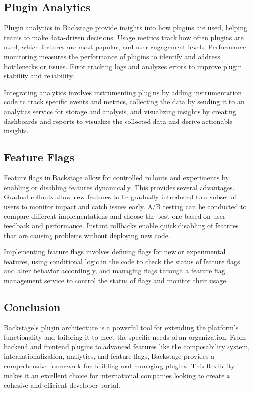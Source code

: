 \subsection{Plugin Analytics}

Plugin analytics in Backstage provide insights into how plugins are used, helping teams to make data-driven decisions. Usage metrics track how often plugins are used, which features are most popular, and user engagement levels. Performance monitoring measures the performance of plugins to identify and address bottlenecks or issues. Error tracking logs and analyzes errors to improve plugin stability and reliability.

Integrating analytics involves instrumenting plugins by adding instrumentation code to track specific events and metrics, collecting the data by sending it to an analytics service for storage and analysis, and visualizing insights by creating dashboards and reports to visualize the collected data and derive actionable insights.

\subsection{Feature Flags}

Feature flags in Backstage allow for controlled rollouts and experiments by enabling or disabling features dynamically. This provides several advantages. Gradual rollouts allow new features to be gradually introduced to a subset of users to monitor impact and catch issues early. A/B testing can be conducted to compare different implementations and choose the best one based on user feedback and performance. Instant rollbacks enable quick disabling of features that are causing problems without deploying new code.

Implementing feature flags involves defining flags for new or experimental features, using conditional logic in the code to check the status of feature flags and alter behavior accordingly, and managing flags through a feature flag management service to control the status of flags and monitor their usage.

\subsection{Conclusion}

Backstage's plugin architecture is a powerful tool for extending the platform's functionality and tailoring it to meet the specific needs of an organization. From backend and frontend plugins to advanced features like the composability system, internationalization, analytics, and feature flags, Backstage provides a comprehensive framework for building and managing plugins. This flexibility makes it an excellent choice for international companies looking to create a cohesive and efficient developer portal.